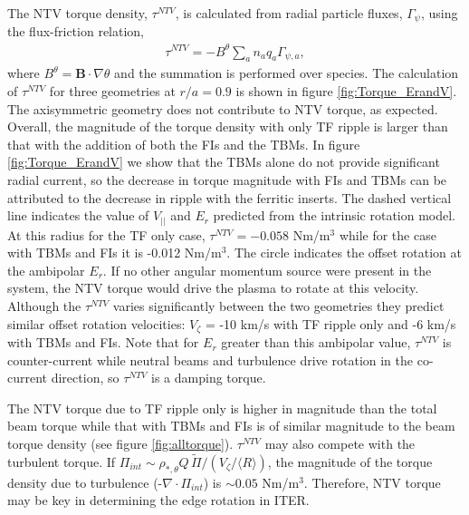 \documentclass{article}
\numberwithin{figure}{section}
\numberwithin{equation}{section}
\begin{document}
The NTV torque density, $\tau^{NTV}$, is calculated from radial particle fluxes, $\Gamma_{\psi}$, using the flux-friction relation,
\begin{gather}
\tau^{NTV} = - B^{\theta} \sum_a n_a q_a \Gamma_{\psi, a},
\end{gather}
where $B^{\theta} = \bm{B} \cdot \nabla \theta$ and the summation is performed over species. The calculation of $\tau^{NTV}$ for three geometries at $r/a = 0.9$ is shown in figure \ref{fig:Torque_ErandV}. The axisymmetric geometry does not contribute to NTV torque, as expected. Overall, the magnitude of the torque density with only TF ripple is larger than that with the addition of both the FIs and the TBMs.  In figure \ref{fig:Torque_ErandV} we show that the TBMs alone do not provide significant radial current, so the decrease in torque magnitude with FIs and TBMs can be attributed to the decrease in ripple with the ferritic inserts. The dashed vertical line indicates the value of $V_{||}$ and $E_r$ predicted from the intrinsic rotation model. At this radius for the TF only case, $\tau^{NTV} = -0.058$ Nm/m$^3$ while for the case with TBMs and FIs it is -0.012 Nm/m$^3$. The circle indicates the offset rotation at the ambipolar $E_r$. If no other angular momentum source were present in the system, the NTV torque would drive the plasma to rotate at this velocity. Although the $\tau^{NTV}$ varies significantly between the two geometries they predict similar offset rotation velocities: $V_{\zeta}$ = -10 km/s with TF ripple only and -6 km/s with TBMs and FIs. Note that for $E_r$ greater than this ambipolar value, $\tau^{NTV}$ is counter-current while neutral beams and turbulence drive rotation in the co-current direction, so $\tau^{NTV}$ is a damping torque.

The NTV torque due to TF ripple only is higher in magnitude than the total beam torque while that with TBMs and FIs is of similar magnitude to the beam torque density (see figure \ref{fig:alltorque}). $\tau^{NTV}$ may also compete with the turbulent torque. If $\Pi_{int} \sim \rho_{*, \theta} Q\, \widetilde{\Pi}/(V_{\zeta}/\langle R \rangle)$, the magnitude of the torque density due to turbulence (-$\nabla \cdot \Pi_{int}$) is $\sim 0.05$ Nm/m$^3$. Therefore, NTV torque may be key in determining the edge rotation in ITER.

\FloatBarrier
\end{document}
